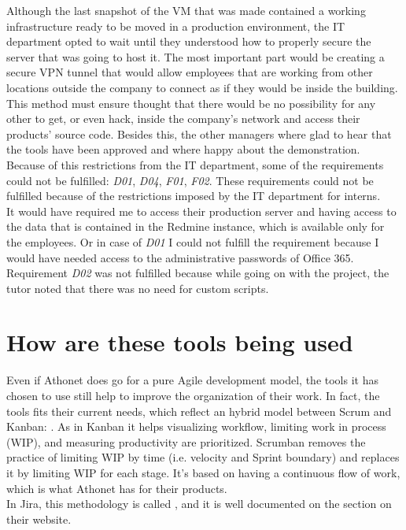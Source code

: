 	Although the last snapshot of the VM that was made contained a working infrastructure ready to be moved in a production environment, the IT department opted to wait until they understood how to properly secure the server that was going to host it.
	The most important part would be creating a secure \gls{VPN tunnel} that would allow employees that are working from other locations outside the company to connect as if they would be inside the building.
	This method must ensure thought that there would be no possibility for any other to get, or even hack, inside the company's network and access their products' source code.
	Besides this, the other managers where glad to hear that the tools have been approved and where happy about the demonstration.\\
	Because of this restrictions from the IT department, some of the requirements could not be fulfilled: \textit{D01}, \textit{D04}, \textit{F01}, \textit{F02}.
	These requirements could not be fulfilled because of the restrictions imposed by the IT department for interns.\\
	It would have required me to access their production server and having access to the data that is contained in the Redmine instance, which is available only for the employees.
	Or in case of \textit{D01} I could not fulfill the requirement because I would have needed access to the administrative passwords of Office 365.\\
	Requirement \textit{D02} was not fulfilled because while going on with the project, the tutor noted that there was no need for custom scripts.
	
\section{How are these tools being used}
	Even if Athonet does go for a pure Agile development model, the tools it has chosen to use still help to improve the organization of their work.
	In fact, the tools fits their current needs, which reflect an hybrid model between Scrum and Kanban: .
	As in Kanban it helps visualizing workflow, limiting work in process (WIP), and measuring productivity are prioritized.	
	Scrumban removes the practice of limiting WIP by time (i.e. velocity and Sprint boundary) and replaces it by limiting WIP for each stage.
	It's based on having a continuous flow of work, which is what Athonet has for their products.\\
	In Jira, this methodology is called \cite{kanplan}, and it is well documented on the  section on their website.
